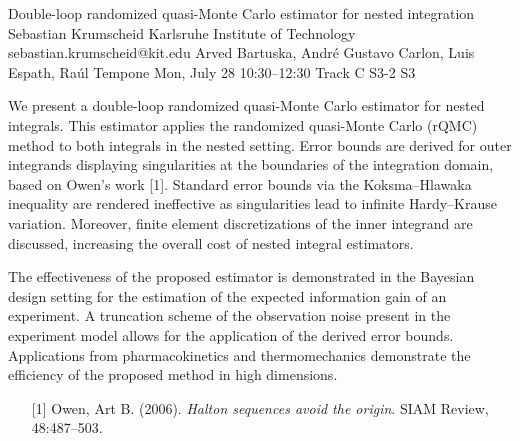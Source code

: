 \begin{talk}
  {Double-loop randomized quasi-Monte Carlo estimator for nested integration}%
  {Sebastian Krumscheid}%
  {Karlsruhe Institute of Technology}%
  {sebastian.krumscheid@kit.edu}%
  {Arved Bartuska, Andr\'{e} Gustavo Carlon, Luis Espath, Ra\'{u}l Tempone}%
  {}%
  {Mon, July 28 10:30–12:30 Track C}%
  {S3-2}%
  {S3}%
  
				
			
We present a double-loop randomized quasi-Monte Carlo estimator for nested integrals. This estimator applies the randomized quasi-Monte Carlo (rQMC) method to both integrals in the nested setting. Error bounds are derived for outer integrands displaying singularities at the boundaries of the integration domain, based on Owen's work [1]. Standard error bounds via the Koksma--Hlawaka inequality are rendered ineffective as singularities lead to infinite Hardy--Krause variation. Moreover, finite element discretizations of the inner integrand are discussed, increasing the overall cost of nested integral estimators. 

The effectiveness of the proposed estimator is demonstrated in the Bayesian design setting for the estimation of the expected information gain of an experiment. A truncation scheme of the observation noise present in the experiment model allows for the application of the derived error bounds. Applications from pharmacokinetics and thermomechanics demonstrate the efficiency of the proposed method in high dimensions.

\medskip

\begin{enumerate}
	\item[{[1]}] Owen, Art B. (2006). {\it Halton sequences avoid the origin}. SIAM Review, 48:487–503.
\end{enumerate}

\end{talk}

